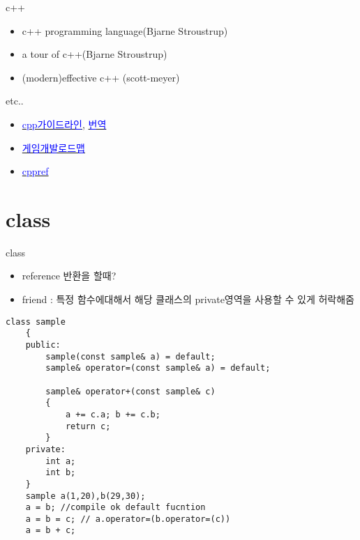 \documentclass[10pt]{beamer}
\begin{document}
\begin{frame}{c++}
    \begin{itemize}
        \item c++ programming language(Bjarne Stroustrup)
        \item a tour of c++(Bjarne Stroustrup)
        \item (modern)effective c++ (scott-meyer)
    \end{itemize}
    etc..

    \begin{itemize}
        \item \href{https://github.com/isocpp/CppCoreGuidelines/blob/master/CppCoreGuidelines.md}{\textcolor{blue}{cpp가이드라인}},
        \href{https://github.com/CppKorea/CppCoreGuidelines}{\textcolor{blue}{번역}}
        \item \href{https://github.com/utilForever/game-developer-roadmap}{\textcolor{blue}{게임개발로드맵}}
        \item \href{https://en.cppreference.com/w/}{\textcolor{blue}{cppref}}
    \end{itemize}
\end{frame}


\section{class}


\begin{frame}{class}
    \begin{itemize}
        \item reference 반환을 할때?
        \item friend : 특정 함수에대해서 해당 클래스의 private영역을 사용할 수 있게 허락해줌
    \end{itemize}
\end{frame}



\begin{frame}[fragile]{ex}
    \begin{lstlisting}[style = CppStyle]
    class sample
    {
    public: 
        sample(const sample& a) = default;
        sample& operator=(const sample& a) = default;
        
        sample& operator+(const sample& c)
        { 
            a += c.a; b += c.b;
            return c;
        }
    private:
        int a;
        int b; 
    }
    sample a(1,20),b(29,30);
    a = b; //compile ok default fucntion
    a = b = c; // a.operator=(b.operator=(c))
    a = b + c;
    \end{lstlisting}
\end{frame}    
\end{document}
